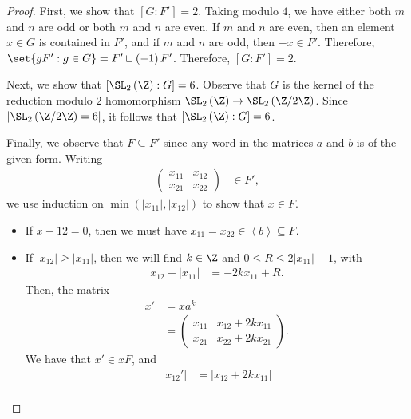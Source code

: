 \documentclass[10pt]{mypackage}
\begin{document}
\begin{proof}
  First, we show that $\left[ G:F' \right] = 2$. Taking modulo $4$, we have either both $m$ and $n$ are odd or both $m$ and $n$ are even. If $m$ and $n$ are even, then an element $x\in G$ is contained in $F'$, and if $m$ and $n$ are odd, then $-x\in F'$. Therefore, $\set{gF' : g\in G} = F'\sqcup \left( -1 \right)F'$. Therefore, $\left[ G:F' \right] = 2$.

  Next, we show that $\left[ \SL_2\left( \Z \right):G \right] = 6$. Observe that $G$ is the kernel of the reduction modulo $2$ homomorphism $\SL_2\left( \Z \right)\rightarrow \SL_2\left( \Z/2\Z \right)$. Since $\left\vert \SL_2\left( \Z/2\Z \right) = 6 \right\vert$, it follows that $\left[ \SL_2\left( \Z \right):G \right] = 6$.

  Finally, we observe that $F\subseteq F'$ since any word in the matrices $a$ and $b$ is of the given form. Writing
  \begin{align*}
    \begin{pmatrix}x_{11} & x_{12} \\ x_{21} & x_{22}\end{pmatrix} &\in F',
  \end{align*}
  we use induction on $\min\left( \left\vert x_{11} \right\vert,\left\vert x_{12} \right\vert \right)$ to show that $x\in F$.
  \begin{itemize}
    \item If $x-{12} = 0$, then we must have $x_{11} = x_{22}\in \left\langle b \right\rangle\subseteq F$.
    \item If $\left\vert x_{12} \right\vert\geq \left\vert x_{11} \right\vert$, then we will find $k\in \Z$ and $0\leq R \leq 2\left\vert x_{11} \right\vert-1$, with
      \begin{align*}
        x_{12} + \left\vert x_{11} \right\vert &= -2kx_{11} + R.
      \end{align*}
      Then, the matrix
      \begin{align*}
        x' &= x a^{k}\\
           &= \begin{pmatrix}x_{11} & x_{12} + 2kx_{11} \\ x_{21} & x_{22} + 2kx_{21}\end{pmatrix}.
      \end{align*}
      We have that $x'\in xF$, and
      \begin{align*}
        \left\vert x_{12}' \right\vert &= \left\vert x_{12} + 2kx_{11} \right\vert\\

\end{align*}
\end{itemize}
\end{proof}
\end{document}
